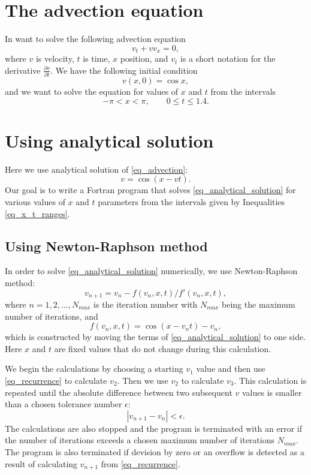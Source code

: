 \section{The advection equation}

In want to solve the following advection equation
\begin{equation}
  v_t + v v_x = 0,
  \label{eq_advection}
\end{equation}
where $v$ is velocity, $t$ is time, $x$ position, and $v_t$ is a short notation for the derivative $\frac{\partial v}{\partial t}$. We have the following initial condition
\[
  v(x, 0) = \cos x,
\]
and we want to solve the equation for values of $x$ and $t$ from the intervals
\begin{equation}
  -\pi < x < \pi, \quad \quad 0 \leq t \leq 1.4.
  \label{eq_x_t_ranges}
\end{equation}


\section{Using analytical solution}

Here we use analytical solution of \autoref{eq_advection}:
\begin{equation}
  v = \cos (x - v t ).
  \label{eq_analytical_solution}
\end{equation}
Our goal is to write a Fortran program that solves \autoref{eq_analytical_solution} for various values of $x$ and $t$ parameters from the intervals given by Inequalities \ref{eq_x_t_ranges}.

\subsection{Using Newton-Raphson method}

In order to solve \autoref{eq_analytical_solution} numerically, we use Newton-Raphson method:
\begin{equation}
  v_{n+1} = v_n - f(v_n, x, t) / f'(v_n, x, t),
  \label{eq_recurrence}
\end{equation}
where $n=1, 2, \dots, N_{max}$ is the iteration number with $N_{max}$ being the maximum number of iterations, and
\[
  f(v_n, x, t) = \cos (x - v_n t) - v_n,
\]
which is constructed by moving the terms of \autoref{eq_analytical_solution} to one side. Here $x$ and $t$ are fixed values that do not change during this calculation.

We begin the calculations by choosing a starting $v_1$ value and then use \autoref{eq_recurrence} to calculate $v_2$. Then we use $v_2$ to calculate $v_3$. This calculation is repeated until the absolute difference between two subsequent $v$ values is smaller than a chosen tolerance number $\epsilon$:
\[
  |{v_{n+1} - v_n}| < \epsilon.
\]
The calculations are also stopped and the program is terminated with an error if the number of iterations exceeds a chosen maximum number of iterations $N_{max}$. The program is also terminated if devision by zero or an overflow is detected as a result of calculating $v_{n+1}$ from \autoref{eq_recurrence}.

